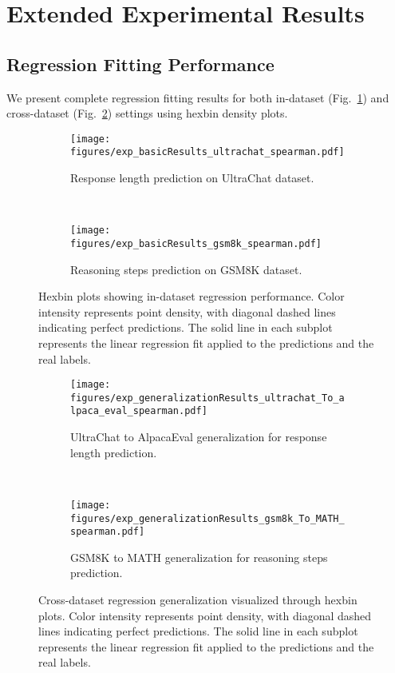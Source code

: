 \section{Extended Experimental Results}
\subsection{Regression Fitting Performance}
We present complete regression fitting results for both in-dataset (Fig.~\ref{fig:exp_appendix_inDataset_regression}) and cross-dataset (Fig.~\ref{fig:exp_appendix_crossDataset_regression}) settings using hexbin density plots.

\begin{figure}[tb!]
\centering
\begin{subfigure}[b]{0.98\linewidth}
\centering
\texttt{[image: figures/exp\_basicResults\_ultrachat\_spearman.pdf]}
\caption{Response length prediction on UltraChat dataset.}
\end{subfigure}
\
\begin{subfigure}[b]{0.98\linewidth}
\centering
\texttt{[image: figures/exp\_basicResults\_gsm8k\_spearman.pdf]}
\caption{Reasoning steps prediction on GSM8K dataset.}
\end{subfigure}
\caption{\label{fig:exp_appendix_inDataset_regression}Hexbin plots showing in-dataset regression performance. Color intensity represents point density, with diagonal dashed lines indicating perfect predictions. The solid line in each subplot represents the linear regression fit applied to the predictions and the real labels.}
\vspace{-18pt}
\end{figure}

\begin{figure}[tb!]
\centering
\begin{subfigure}[b]{0.98\linewidth}
\centering
\texttt{[image: figures/exp\_generalizationResults\_ultrachat\_To\_alpaca\_eval\_spearman.pdf]}
\caption{UltraChat to AlpacaEval generalization for response length prediction.}
\end{subfigure}
\
\begin{subfigure}[b]{0.98\linewidth}
\centering
\texttt{[image: figures/exp\_generalizationResults\_gsm8k\_To\_MATH\_spearman.pdf]}
\caption{GSM8K to MATH generalization for reasoning steps prediction.}
\end{subfigure}
\caption{\label{fig:exp_appendix_crossDataset_regression}Cross-dataset regression generalization visualized through hexbin plots. Color intensity represents point density, with diagonal dashed lines indicating perfect predictions. The solid line in each subplot represents the linear regression fit applied to the predictions and the real labels.}
\vspace{-18pt}
\end{figure}